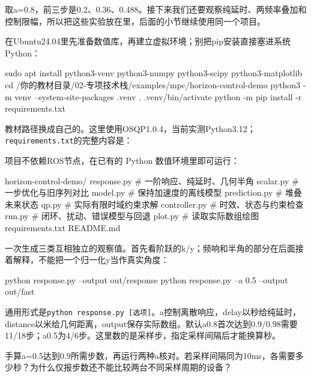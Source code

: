 \begin{example}[先把原来的三步响应跑出来]
取a=0.8，前三步是0.2、0.36、0.488。接下来我们还要观察纯延时、两频率叠加和控制限幅，所以把这些实验放在里，后面的小节继续使用同一个项目。

在Ubuntu24.04里先准备数值库，再建立虚拟环境；别把pip安装直接塞进系统Python：
\begin{tbash}
sudo apt install python3-venv python3-numpy python3-scipy python3-matplotlib
cd /你的教材目录/02-专项技术栈/examples/mpc/horizon-control-demo
python3 -m venv --system-site-packages .venv
. .venv/bin/activate
python -m pip install -r requirements.txt
\end{tbash}
教材路径换成自己的。这里使用OSQP1.0.4，当前实测Python3.12；\texttt{requirements.txt}的完整内容是：

项目不依赖ROS节点，在已有的 Python 数值环境里即可运行：
\par\smallskip\noindent\begin{minipage}{\linewidth}
\begin{tbash}
horizon-control-demo/
  response.py    # 一阶响应、纯延时、几何半角
  scalar.py      # 一步优化与旧序列对比
  model.py       # 保持加速度的离线模型
  prediction.py  # 堆叠未来状态
  qp.py          # 实际有限时域约束求解
  controller.py  # 时效、状态与约束检查
  run.py         # 闭环、扰动、错误模型与回退
  plot.py        # 读取实际数组绘图
  requirements.txt
  README.md
\end{tbash}
\end{minipage}\par
{}一次生成三类互相独立的观察值。首先看阶跃的k/y；频响和半角的部分在后面接着解释，不能把一个归一化y当作真实角度：

\begin{tbash}
python response.py --output out/response
python response.py --a 0.5 --output out/fast
\end{tbash}
通用形式是\texttt{python response.py [选项]}。a控制离散响应，delay以秒给纯延时，distance以米给几何距离，output保存实际数组。默认a0.8首次达到0.9/0.98需要11/18步；a0.5为4/6步。这里数的是采样步，指定采样间隔后才能换算秒。
\end{example}
\begin{exercise}\label{ex:v2-mpc-step}
手算a=0.5达到0.9所需步数，再运行两种a核对。若采样间隔同为10ms，各需要多少秒？为什么仅报步数还不能比较两台不同采样周期的设备？
\end{exercise}

